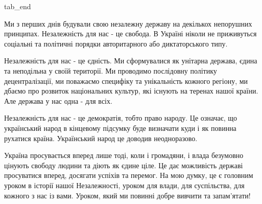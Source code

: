   tab_end
\fi

Ми з перших днів будували свою незалежну державу на декількох непорушних
принципах. Незалежність для нас - це свобода. В Україні ніколи не приживуться
соціальні та політичні порядки авторитарного або диктаторського типу.

Незалежність для нас - це єдність. Ми сформувалися як унітарна держава, єдина
та неподільна у своїй території. Ми проводимо послідовну політику
децентралізації, ми поважаємо специфіку та унікальність кожного регіону, ми
дбаємо про розвиток національних культур, які існують на теренах нашої країни.
Але держава у нас одна - для всіх.

Незалежність для нас - це демократія, тобто право народу. Це означає, що
український народ в кінцевому підсумку буде визначати куди і як повинна
рухатися країна. Український народ це доводив неодноразово.

Україна просувається вперед лише тоді, коли і громадяни, і влада безумовно
цінують свободу людини та діють як єдине ціле. Це дає можливість державі
просуватися вперед, досягати успіхів та перемог. На мою думку, це є головним
уроком в історії нашої Незалежності, уроком для влади, для суспільства, для
кожного з нас із вами. Уроком, який ми повинні добре вивчити та запам'ятати!
